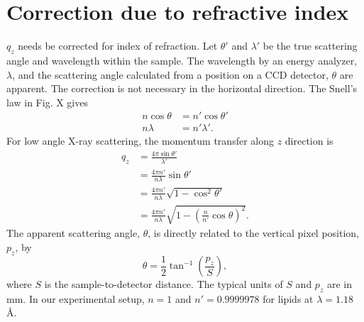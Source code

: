 \documentclass[12pt,letterpaper]{article}
\begin{document}
\section{Correction due to refractive index}
$q_z$ needs be corrected for index of refraction.
Let $\theta'$ and $\lambda'$ be the true scattering angle and wavelength
within the sample. The wavelength by an energy analyzer, $\lambda$, and the 
scattering angle calculated from a position on a CCD detector, $\theta$ are 
apparent. The correction is not necessary in the horizontal direction.
The Snell's law in Fig. X gives
\begin{align}
  n\cos\theta &= n'\cos\theta' \\
  n\lambda &= n'\lambda'.
\end{align}
For low angle X-ray scattering, the momentum transfer along $z$ direction is
\begin{align}
  q_z &= \frac{4\pi\sin\theta'}{\lambda'} \\
      &= \frac{4\pi n'}{n\lambda}\sin\theta' \\
      &= \frac{4\pi n'}{n\lambda}\sqrt{1-\cos^2\theta'} \\
      &= \frac{4\pi n'}{n\lambda}\sqrt{1-\left(\frac{n}{n'}\cos\theta\right)^2}.
\end{align}
The apparent scattering angle, $\theta$, is directly related to the vertical
pixel position, $p_z$, by 
\begin{equation}
  \theta = \frac{1}{2}\tan^{-1}\left(\frac{p_z}{S}\right),
\end{equation}
where $S$ is the sample-to-detector distance. The typical units of $S$ and 
$p_z$ are in mm. In our experimental setup,
$n=1$ and $n'=0.9999978$ for lipids at $\lambda=1.18$ \AA. 


\end{document}

